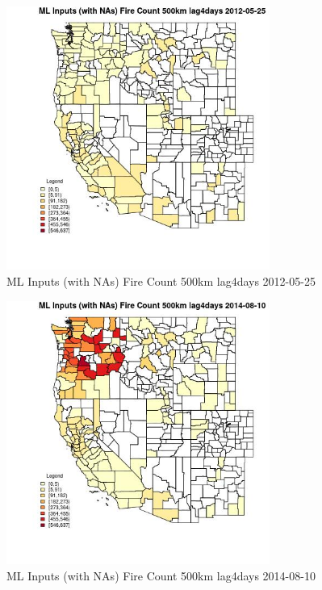 \begin{figure} 
\centering  
\includegraphics[width=0.77\textwidth]{Code_Outputs/Report_ML_input_PM25_Step4_part_e_de_duplicated_aves_compiled_2019-05-18wNAs_CountyFire_Count_500km_lag4daysMean2012-05-25.jpg} 
\caption{\label{fig:Report_ML_input_PM25_Step4_part_e_de_duplicated_aves_compiled_2019-05-18wNAsCountyFire_Count_500km_lag4daysMean2012-05-25}ML Inputs (with NAs) Fire Count 500km lag4days 2012-05-25} 
\end{figure} 
 

\begin{figure} 
\centering  
\includegraphics[width=0.77\textwidth]{Code_Outputs/Report_ML_input_PM25_Step4_part_e_de_duplicated_aves_compiled_2019-05-18wNAs_CountyFire_Count_500km_lag4daysMean2014-08-10.jpg} 
\caption{\label{fig:Report_ML_input_PM25_Step4_part_e_de_duplicated_aves_compiled_2019-05-18wNAsCountyFire_Count_500km_lag4daysMean2014-08-10}ML Inputs (with NAs) Fire Count 500km lag4days 2014-08-10} 
\end{figure} 
 

